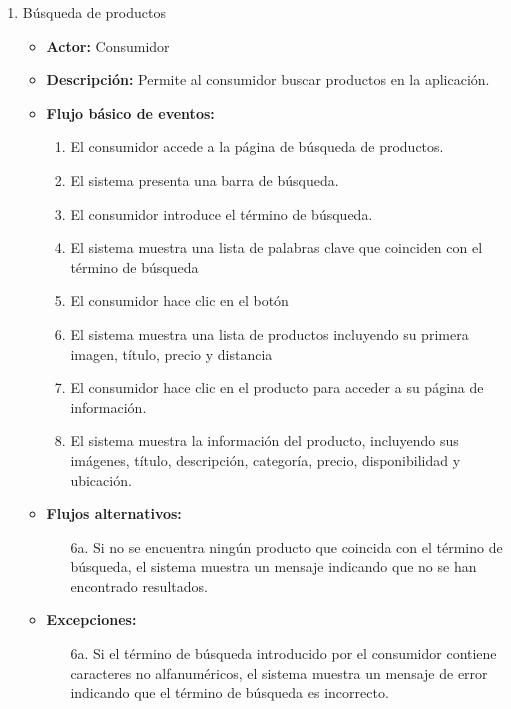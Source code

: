 \begin{enumerate}[CU-1:]
\item{Búsqueda de productos}
\begin{itemize}
	\item \textbf{Actor:} Consumidor
	\item \textbf{Descripción:} Permite al consumidor buscar productos en la aplicación.
	\item \textbf{Flujo básico de eventos:}
	\begin{enumerate}[1:]
		\item El consumidor accede a la página de búsqueda de productos.
		\item El sistema presenta una barra de búsqueda.
		\item El consumidor introduce el término de búsqueda.
		\item El sistema muestra una lista de palabras clave que coinciden con el término de búsqueda
		\item El consumidor hace clic en el botón 
		\item El sistema muestra una lista de productos incluyendo su primera imagen, título, precio y distancia
		\item El consumidor hace clic en el producto para acceder a su página de información.
		\item El sistema muestra la información del producto, incluyendo sus imágenes, título, descripción, categoría, precio, disponibilidad y ubicación.
		\end{enumerate}
	\item \textbf{Flujos alternativos:}
	\begin{enumerate}
		\item[6a.] Si no se encuentra ningún producto que coincida con el término de búsqueda, el sistema muestra un mensaje indicando que no se han encontrado resultados.
		\end{enumerate}
	\item \textbf{Excepciones:}
	\begin{enumerate}
		\item[6a.] Si el término de búsqueda introducido por el consumidor contiene caracteres no alfanuméricos, el sistema muestra un mensaje de error indicando que el término de búsqueda es incorrecto.
		\end{enumerate}
\end{itemize}


\end{enumerate}
